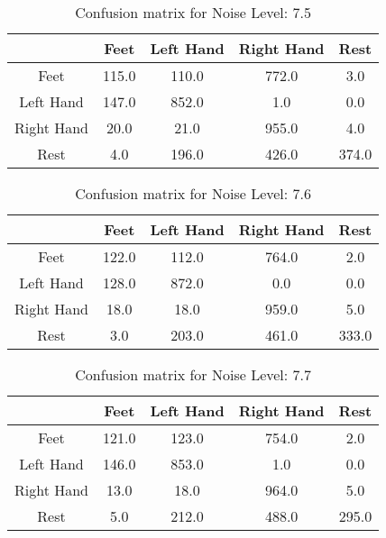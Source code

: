 \begin{table}[!htbp]
    \centering
    \begin{tabular}{|c||c|c|c|c|}
        \hline
		 & Feet & Left Hand & Right Hand & Rest \\
        \hline
        \hline
        Feet & 115.0 & 110.0 & 772.0 & 3.0 \\
        \hline
        Left Hand & 147.0 & 852.0 & 1.0 & 0.0 \\
        \hline
        Right Hand & 20.0 & 21.0 & 955.0 & 4.0 \\
        \hline
        Rest & 4.0 & 196.0 & 426.0 & 374.0 \\
        \hline
    \end{tabular}
    \caption{Confusion matrix for Noise Level: 7.5}
\end{table}

\begin{table}[!htbp]
    \centering
    \begin{tabular}{|c||c|c|c|c|}
        \hline
		 & Feet & Left Hand & Right Hand & Rest \\
        \hline
        \hline
        Feet & 122.0 & 112.0 & 764.0 & 2.0 \\
        \hline
        Left Hand & 128.0 & 872.0 & 0.0 & 0.0 \\
        \hline
        Right Hand & 18.0 & 18.0 & 959.0 & 5.0 \\
        \hline
        Rest & 3.0 & 203.0 & 461.0 & 333.0 \\
        \hline
    \end{tabular}
    \caption{Confusion matrix for Noise Level: 7.6}
\end{table}

\begin{table}[!htbp]
    \centering
    \begin{tabular}{|c||c|c|c|c|}
        \hline
		 & Feet & Left Hand & Right Hand & Rest \\
        \hline
        \hline
        Feet & 121.0 & 123.0 & 754.0 & 2.0 \\
        \hline
        Left Hand & 146.0 & 853.0 & 1.0 & 0.0 \\
        \hline
        Right Hand & 13.0 & 18.0 & 964.0 & 5.0 \\
        \hline
        Rest & 5.0 & 212.0 & 488.0 & 295.0 \\
        \hline
    \end{tabular}
    \caption{Confusion matrix for Noise Level: 7.7}
\end{table}

